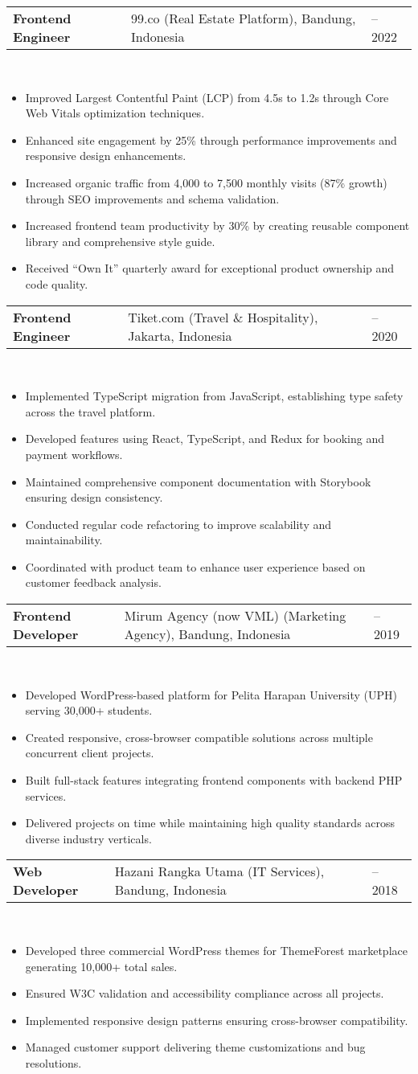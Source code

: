 \documentclass[a4paper, 11pt]{article}
\newcommand{\resumeItem}[1]{
  \item\small{
    {#1 \vspace{-2pt}}
  }
}
\newcommand{\resumeSubheading}[4]{
  \vspace{-2pt}\item
    \begin{tabularx}{0.987\textwidth}[t]{
  >{\raggedright\arraybackslash}X
  >{\centering\arraybackslash}X
  >{\raggedleft\arraybackslash}X }
      \textbf{#1} & #2 & #3 \\
    \end{tabularx}
    \textit{\small#4}\\
    \vspace{-7pt}
}
\newcommand{\resumeItemListStart}{\begin{itemize}[leftmargin=0.22in]}
\newcommand{\resumeItemListEnd}{\end{itemize}\vspace{-20pt}}
\begin{document}
        \resumeSubheading
            {Frontend Engineer}{99.co (Real Estate Platform), Bandung, Indonesia}{2020 -- 2022}{}
            \resumeItemListStart
                \resumeItem{Improved Largest Contentful Paint (LCP) from 4.5s to 1.2s through Core Web Vitals optimization techniques.}
                \resumeItem{Enhanced site engagement by 25\% through performance improvements and responsive design enhancements.}
                \resumeItem{Increased organic traffic from 4,000 to 7,500 monthly visits (87\% growth) through SEO improvements and schema validation.}
                \resumeItem{Increased frontend team productivity by 30\% by creating reusable component library and comprehensive style guide.}
                \resumeItem{Received ``Own It'' quarterly award for exceptional product ownership and code quality.}
            \resumeItemListEnd

        \resumeSubheading
            {Frontend Engineer}{Tiket.com (Travel \& Hospitality), Jakarta, Indonesia}{2019 -- 2020}{}
            \resumeItemListStart
                \resumeItem{Implemented TypeScript migration from JavaScript, establishing type safety across the travel platform.}
                \resumeItem{Developed features using React, TypeScript, and Redux for booking and payment workflows.}
                \resumeItem{Maintained comprehensive component documentation with Storybook ensuring design consistency.}
                \resumeItem{Conducted regular code refactoring to improve scalability and maintainability.}
                \resumeItem{Coordinated with product team to enhance user experience based on customer feedback analysis.}
            \resumeItemListEnd

        \resumeSubheading
            {Frontend Developer}{Mirum Agency (now VML) (Marketing Agency), Bandung, Indonesia}{2018 -- 2019}{}
            \resumeItemListStart
                \resumeItem{Developed WordPress-based platform for Pelita Harapan University (UPH) serving 30,000+ students.}
                \resumeItem{Created responsive, cross-browser compatible solutions across multiple concurrent client projects.}
                \resumeItem{Built full-stack features integrating frontend components with backend PHP services.}
                \resumeItem{Delivered projects on time while maintaining high quality standards across diverse industry verticals.}
            \resumeItemListEnd

        \resumeSubheading
            {Web Developer}{Hazani Rangka Utama (IT Services), Bandung, Indonesia}{2017 -- 2018}{}
            \resumeItemListStart
                \resumeItem{Developed three commercial WordPress themes for ThemeForest marketplace generating 10,000+ total sales.}
                \resumeItem{Ensured W3C validation and accessibility compliance across all projects.}
                \resumeItem{Implemented responsive design patterns ensuring cross-browser compatibility.}
                \resumeItem{Managed customer support delivering theme customizations and bug resolutions.}
            \resumeItemListEnd
\end{document}
